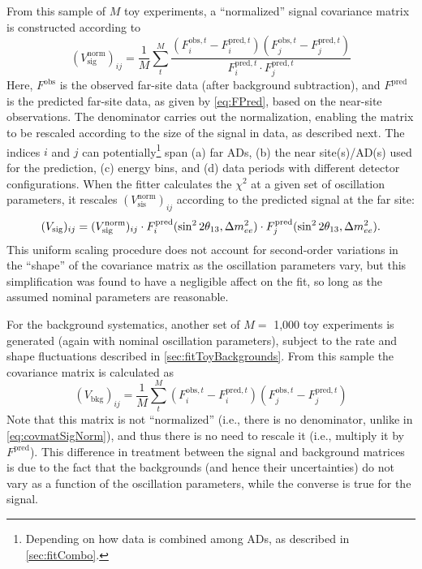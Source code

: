 \documentclass[../thesis.tex]{subfiles}
\begin{document}
From this sample of $M$ toy experiments, a ``normalized'' signal covariance matrix is constructed according to
\begin{equation}
  \label{eq:covmatSigNorm}
  (V^{\mathrm{norm}}_{\mathrm{sig}})_{ij} = \frac{1}{M} \sum_t^{M}
  \frac{(F^{\mathrm{obs},t}_i - F^{\mathrm{pred},t}_i)(F^{\mathrm{obs},t}_j - F^{\mathrm{pred},t}_j)}%
       {F^{\mathrm{pred},t}_i \cdot F^{\mathrm{pred},t}_j}
\end{equation}
Here, $F^{\mathrm{obs}}$ is the observed far-site data (after background subtraction), and $F^{\mathrm{pred}}$ is the predicted far-site data, as given by \autoref{eq:FPred}, based on the near-site observations. The denominator carries out the normalization, enabling the matrix to be rescaled according to the size of the signal in data, as described next. The indices $i$ and $j$ can potentially\footnote{Depending on how data is combined among ADs, as described in \autoref{sec:fitCombo}.} span (a) far ADs, (b) the near site(s)/AD(s) used for the prediction, (c) energy bins, and (d) data periods with different detector configurations. When the fitter calculates the $\chi^2$ at a given set of oscillation parameters, it rescales $(V^{\mathrm{norm}}_{\mathrm{sis}})_{ij}$ according to the predicted signal at the far site:
\begin{equation}
  (V_{\mathrm{sig}})_{ij} = (V^{\mathrm{norm}}_{\mathrm{sig}})_{ij} \cdot F^{\mathrm{pred}}_i(\sin^2 2\theta_{13}, \Delta m^2_{ee})
  \cdot F^{\mathrm{pred}}_j(\sin^2 2\theta_{13}, \Delta m^2_{ee}).
\end{equation}
This uniform scaling procedure does not account for second-order variations in the ``shape'' of the covariance matrix as the oscillation parameters vary, but this simplification was found to have a negligible affect on the fit, so long as the assumed nominal parameters are reasonable.

For the background systematics, another set of $M = $ 1,000 toy experiments is generated (again with nominal oscillation parameters), subject to the rate and shape fluctuations described in \autoref{sec:fitToyBackgrounds}. From this sample the covariance matrix is calculated as
\begin{equation}
  \label{eq:covmatBG}
  (V_{\mathrm{bkg}})_{ij} = \frac{1}{M} \sum_t^{M}
  (F^{\mathrm{obs},t}_i - F^{\mathrm{pred},t}_i)(F^{\mathrm{obs},t}_j - F^{\mathrm{pred},t}_j)
\end{equation}
Note that this matrix is not ``normalized'' (i.e., there is no denominator, unlike in \autoref{eq:covmatSigNorm}), and thus there is no need to rescale it (i.e., multiply it by $F^{\mathrm{pred}}$). This difference in treatment between the signal and background matrices is due to the fact that the backgrounds (and hence their uncertainties) do not vary as a function of the oscillation parameters, while the converse is true for the signal.
\end{document}
